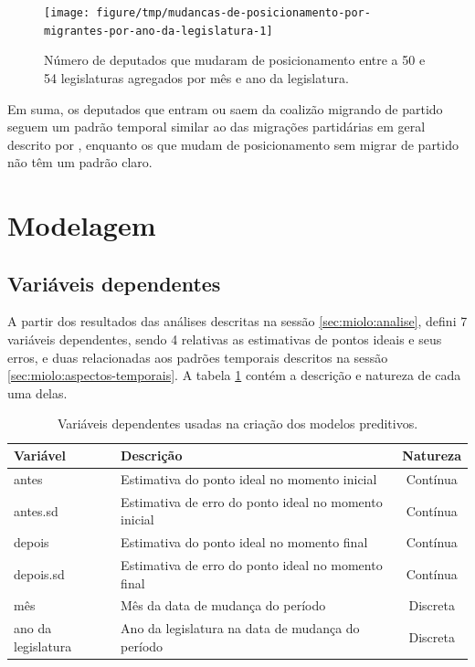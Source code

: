 \documentclass[a4paper,titlepage]{ppgi}\usepackage[]{graphicx}\usepackage[]{color}
\newenvironment{knitrout}{}{} %
\begin{document}
\begin{knitrout}
\color{fgcolor}\begin{figure}
\texttt{[image: figure/tmp/mudancas-de-posicionamento-por-migrantes-por-ano-da-legislatura-1]} \caption[Número de deputados que mudaram de posicionamento entre a 50\textordfeminine{} e 54\textordfeminine{} legislaturas agregados por mês e ano da legislatura]{Número de deputados que mudaram de posicionamento entre a 50\textordfeminine{} e 54\textordfeminine{} legislaturas agregados por mês e ano da legislatura.}\label{fig:mudancas-de-posicionamento-por-migrantes-por-ano-da-legislatura}
\end{figure}


\end{knitrout}

Em suma, os deputados que entram ou saem da coalizão migrando de partido
seguem um padrão temporal similar ao das migrações partidárias em geral
descrito por , enquanto os que mudam de posicionamento
sem migrar de partido não têm um padrão claro.

\section{Modelagem}

\subsection{Variáveis dependentes}
\label{sec:miolo:variaveis-dependentes}

A partir dos resultados das análises descritas na sessão
\ref{sec:miolo:analise}, defini 7 variáveis dependentes, sendo 4 relativas
as estimativas de pontos ideais e seus erros, e duas relacionadas aos padrões
temporais descritos na sessão \ref{sec:miolo:aspectos-temporais}. A tabela
\ref{table:variaveis-dependentes} contém a descrição e natureza de cada uma
delas.

\begin{table}
\centering
\begin{tabular}{l l c}
  Variável & Descrição & Natureza \\
  \hline
  antes & Estimativa do ponto ideal no momento inicial & Contínua \\
  antes.sd & Estimativa de erro do ponto ideal no momento inicial& Contínua \\
  depois & Estimativa do ponto ideal no momento final & Contínua \\
  depois.sd & Estimativa de erro do ponto ideal no momento final & Contínua \\
  mês & Mês da data de mudança do período & Discreta \\
  ano da legislatura & Ano da legislatura na data de mudança do período & Discreta \\
\end{tabular}
\caption{Variáveis dependentes usadas na criação dos modelos preditivos.}
\label{table:variaveis-dependentes}
\end{table}
\end{document}
